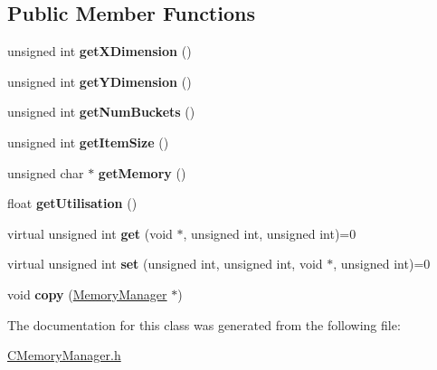 \subsection*{\-Public \-Member \-Functions}
\begin{DoxyCompactItemize}
\item 
\hypertarget{classCMemoryManager_a7f0853bb3609caf1b084ce0ac5b4aa34}{unsigned int {\bfseries get\-X\-Dimension} ()}\label{classCMemoryManager_a7f0853bb3609caf1b084ce0ac5b4aa34}

\item 
\hypertarget{classCMemoryManager_a947490fcd92cd1b6f9968f49f0cb0ecc}{unsigned int {\bfseries get\-Y\-Dimension} ()}\label{classCMemoryManager_a947490fcd92cd1b6f9968f49f0cb0ecc}

\item 
\hypertarget{classCMemoryManager_ab90ebb30a97ab79211bf20359aba7913}{unsigned int {\bfseries get\-Num\-Buckets} ()}\label{classCMemoryManager_ab90ebb30a97ab79211bf20359aba7913}

\item 
\hypertarget{classCMemoryManager_a12a5ec26cefc772818ea7dcc9e8781f3}{unsigned int {\bfseries get\-Item\-Size} ()}\label{classCMemoryManager_a12a5ec26cefc772818ea7dcc9e8781f3}

\item 
\hypertarget{classCMemoryManager_a33e2c310d1e9ff7f8d5f8ba3c12ee872}{unsigned char $\ast$ {\bfseries get\-Memory} ()}\label{classCMemoryManager_a33e2c310d1e9ff7f8d5f8ba3c12ee872}

\item 
\hypertarget{classCMemoryManager_a8c177a1829f13e49e55fbe2dc8dd8127}{float {\bfseries get\-Utilisation} ()}\label{classCMemoryManager_a8c177a1829f13e49e55fbe2dc8dd8127}

\item 
\hypertarget{classCMemoryManager_ad7d31937687b828ea2be18f53119c303}{virtual unsigned int {\bfseries get} (void $\ast$, unsigned int, unsigned int)=0}\label{classCMemoryManager_ad7d31937687b828ea2be18f53119c303}

\item 
\hypertarget{classCMemoryManager_a0b6717867d1c3ef651c71140410aed98}{virtual unsigned int {\bfseries set} (unsigned int, unsigned int, void $\ast$, unsigned int)=0}\label{classCMemoryManager_a0b6717867d1c3ef651c71140410aed98}

\item 
\hypertarget{classCMemoryManager_a9771169bf4350124ddc1eacf41c806ac}{void {\bfseries copy} (\hyperlink{classMemoryManager}{\-Memory\-Manager} $\ast$)}\label{classCMemoryManager_a9771169bf4350124ddc1eacf41c806ac}

\end{DoxyCompactItemize}


\-The documentation for this class was generated from the following file\-:\begin{DoxyCompactItemize}
\item 
\hyperlink{CMemoryManager_8h}{\-C\-Memory\-Manager.\-h}\end{DoxyCompactItemize}
